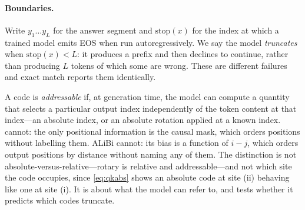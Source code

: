 \paragraph{Boundaries.} Write $y_1\ldots y_L$ for the answer segment and
$\mathrm{stop}(x)$ for the index at which a trained model emits EOS when run
autoregressively. We say the model \emph{truncates} when $\mathrm{stop}(x) < L$: it
produces a prefix and then declines to continue, rather than producing $L$ tokens of
which some are wrong. These are different failures and exact match reports them
identically.

A code is \emph{addressable} if, at generation time, the model can compute a quantity
that selects a particular output index independently of the token content at that
index---an absolute index, or an absolute rotation applied at a known index. \nope{}
cannot: the only positional information is the causal mask, which orders positions
without labelling them. ALiBi cannot: its bias is a function of $i-j$, which orders
output positions by distance without naming any of them. The distinction is not
absolute-versus-relative---rotary is relative and addressable---and not which site
the code occupies, since \eqref{eq:qkabs} shows an absolute code at site (ii)
behaving like one at site (i). It is about what the model can refer to, and
 tests whether it predicts which codes truncate.
